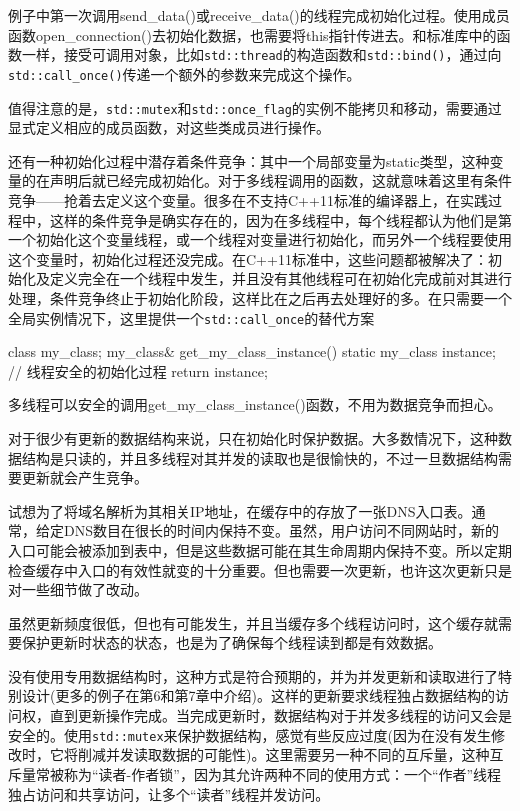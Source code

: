 例子中第一次调用send\_data()或receive\_data()的线程完成初始化过程。使用成员函数open\_connection()去初始化数据，也需要将this指针传进去。和标准库中的函数一样，接受可调用对象，比如\texttt{std::thread}的构造函数和\texttt{std::bind()}，通过向\texttt{std::call\_once()}传递一个额外的参数来完成这个操作。

值得注意的是，\texttt{std::mutex}和\texttt{std::once\_flag}的实例不能拷贝和移动，需要通过显式定义相应的成员函数，对这些类成员进行操作。

还有一种初始化过程中潜存着条件竞争：其中一个局部变量为static类型，这种变量的在声明后就已经完成初始化。对于多线程调用的函数，这就意味着这里有条件竞争——抢着去定义这个变量。很多在不支持C++11标准的编译器上，在实践过程中，这样的条件竞争是确实存在的，因为在多线程中，每个线程都认为他们是第一个初始化这个变量线程，或一个线程对变量进行初始化，而另外一个线程要使用这个变量时，初始化过程还没完成。在C++11标准中，这些问题都被解决了：初始化及定义完全在一个线程中发生，并且没有其他线程可在初始化完成前对其进行处理，条件竞争终止于初始化阶段，这样比在之后再去处理好的多。在只需要一个全局实例情况下，这里提供一个\texttt{std::call\_once}的替代方案

\begin{cpp}
class my_class;
my_class& get_my_class_instance()
{
  static my_class instance;  // 线程安全的初始化过程
  return instance;
}
\end{cpp}

多线程可以安全的调用get\_my\_class\_instance()函数，不用为数据竞争而担心。

对于很少有更新的数据结构来说，只在初始化时保护数据。大多数情况下，这种数据结构是只读的，并且多线程对其并发的读取也是很愉快的，不过一旦数据结构需要更新就会产生竞争。


试想为了将域名解析为其相关IP地址，在缓存中的存放了一张DNS入口表。通常，给定DNS数目在很长的时间内保持不变。虽然，用户访问不同网站时，新的入口可能会被添加到表中，但是这些数据可能在其生命周期内保持不变。所以定期检查缓存中入口的有效性就变的十分重要。但也需要一次更新，也许这次更新只是对一些细节做了改动。

虽然更新频度很低，但也有可能发生，并且当缓存多个线程访问时，这个缓存就需要保护更新时状态的状态，也是为了确保每个线程读到都是有效数据。

没有使用专用数据结构时，这种方式是符合预期的，并为并发更新和读取进行了特别设计(更多的例子在第6和第7章中介绍)。这样的更新要求线程独占数据结构的访问权，直到更新操作完成。当完成更新时，数据结构对于并发多线程的访问又会是安全的。使用\texttt{std::mutex}来保护数据结构，感觉有些反应过度(因为在没有发生修改时，它将削减并发读取数据的可能性)。这里需要另一种不同的互斥量，这种互斥量常被称为“读者-作者锁”，因为其允许两种不同的使用方式：一个“作者”线程独占访问和共享访问，让多个“读者”线程并发访问。

